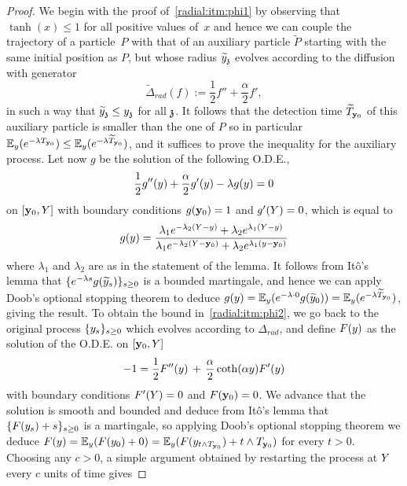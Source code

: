 \begin{proof}
We begin with the proof of~\eqref{radial:itm:phi1} by observing that $\tanh(x)\leq 1$ for all positive values of~$x$ and hence we can couple the trajectory of a particle~$P$ with that of an auxiliary particle $\widetilde{P}$ starting with the same initial position as $P$, but whose radius $\widetilde{\auxy}_\ss$ evolves according to the diffusion with generator
\[
\widetilde{\Delta}_{rad}(f) := \frac{1}{2}f''+\frac{\alpha}{2}f',
\]
in such a way that $\widetilde{\auxy}_\ss\leq y_\ss$ for all $\ss$. It follows that the detection time $\widetilde{T}_{\yabs_0}$ of this auxiliary particle is smaller than the one of $P$ so in particular $\EE_{\auxy}(e^{-\lambda T_{\yabs_0}})\leq\EE_{\auxy}(e^{-\lambda \widetilde{T}_{\yabs_0}})$, and it suffices to prove the inequality for the auxiliary process. Let now $g$ be the solution of the following O.D.E.,
\begin{equation}\label{ODE1}
\frac{1}{2}g''(\auxy)+\frac{\alpha}{2}g'(\auxy)-\lambda g(\auxy)=0
\end{equation}
on $[\yabs_0,\auxY]$ with boundary conditions $g(\yabs_0)=1$ and $g'(\auxY)=0$, which is equal to
\[g(\auxy) = \frac{\lambda_1 e^{-\lambda_2 (\auxY-\auxy)}+\lambda_2 e^{\lambda_1(\auxY-\auxy)}}{{\lambda_1 e^{-\lambda_2 (\auxY-\yabs_0)}+\lambda_2 e^{\lambda_1(\auxy-\yabs_0)}}}\]
where $\lambda_1$ and $\lambda_2$ are as in the statement of the lemma. It follows from Itô's lemma that $\{e^{-\lambda s}g(\widetilde{\auxy}_s)\}_{s \ge 0}$ is a bounded martingale, and hence we can apply Doob's optional stopping theorem to deduce $g(\auxy)=\EE_{\auxy}(e^{-\lambda\cdot 0}g(\widetilde{\auxy}_0))=\EE_{\auxy}(e^{-\lambda\widetilde{T}_{\yabs_0}})$, giving the result. To obtain the bound in~\eqref{radial:itm:phi2}, we go back to the original process $\{\auxy_s\}_{s \ge 0}$ which evolves according to $\Delta_{rad}$, and define $F(\auxy)$ as the solution of the O.D.E. on $[\yabs_0,\auxY]$
\begin{equation}\label{eq(ii)}
-1 = \frac{1}{2}F''(\auxy)\,+\,\frac{\alpha}{2}\cotanh(\alpha \auxy)F'(\auxy)
\end{equation}
with boundary conditions $F'(\auxY)=0$ and $F(\yabs_0)=0$. We advance that the solution is smooth and bounded and deduce from Itô's lemma that $\{F(\auxy_s)+s\}_{s\ge 0}$ is a martingale, so applying Doob's optional stopping theorem we deduce $F(\auxy)=\EE_{\auxy}(F(\auxy_0)+0)=\EE_{\auxy}(F(\auxy_{t\wedge T_{\yabs_0}})+t\wedge T_{\yabs_0})$ for every $t>0$. Choosing any $c>0$, a simple argument obtained by restarting the process at $\auxY$ every $c$ units of time gives

\end{proof}
